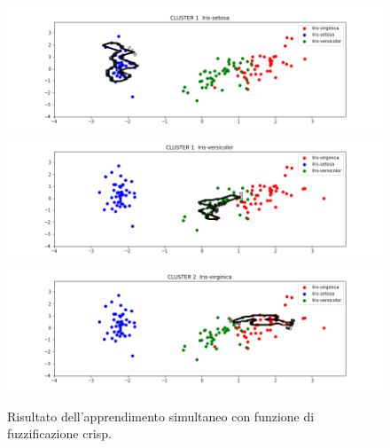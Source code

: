 \documentclass [11pt,a4paper,twoside,openright] {book}
\begin{document}
\begin{figure}[!tb]
        \centering%
        \subfigure%
          {\includegraphics[scale=.3, angle=90]{figure/crispset1.png}}\qquad\qquad
       \subfigure%
          {\includegraphics[scale=.3, angle=90]{figure/crispset2.png}}\qquad\qquad
           \subfigure%
          {\includegraphics[scale=.3, angle=90]{figure/crispset3.png}}
          \caption{Risultato dell'apprendimento simultaneo con funzione di fuzzificazione crisp\label{crispset}.}
\end{figure}
\end{document}
